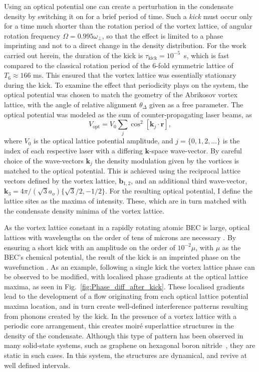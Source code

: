 Using an optical potential one can create a perturbation in the condensate density by switching it on for a brief period of time. Such a {\it kick} must occur only for a time much shorter than the rotation period of the vortex lattice, of angular rotation frequency $\Omega = 0.995\omega_\perp$, so that the effect is limited to a phase imprinting and not to a direct change in the density distribution. For the work carried out herein, the duration of the kick is $\tau_{\text{kick}}=10^{-5}$~s, which is fast compared to the classical rotation period of the 6-fold symmetric lattice of $T_{6} \approx 166 $ ms. This ensured that the vortex lattice was essentially stationary during the kick. To examine the effect that periodicity plays on the system, the optical potential was chosen to match the geometry of the Abrikosov vortex lattice, with the angle of relative alignment $\theta_\Delta$ given as a free parameter. The optical potential was modeled as the sum of counter-propagating laser beams, as
\begin{equation}
    V_{\text{opt}} = V_0\displaystyle\sum_{j}\cos^2 \left[ \textbf{k}_{j}\cdot\textbf{r} \right],
\end{equation}
where $V_0$ is the optical lattice potential amplitude, and $j=\lbrace 0,1,2,\ldots \rbrace$ is the index of each respective laser with a differing $\mathbf{k}$-space wave-vector. By careful choice of the wave-vectors $\textbf{k}_{j}$ the density modulation given by the vortices is matched to the optical potential. This is achieved using the reciprocal lattice vectors defined by the vortex lattice, $\mathbf{b}_{1,2}$, and an additional third wave-vector, $\mathbf{k}_3 = 4\pi/(\sqrt{3}a_o)\{\sqrt{3}/2,-1/2\}$. For the resulting optical potential, I define the lattice sites as the maxima of intensity. These, which are in turn matched with the condensate density minima of the vortex lattice.


As the vortex lattice constant in a rapidly rotating atomic BEC is large, optical lattices with wavelengths on the order of tens of microns are necessary \cite{BEC:Fallani_optexp_2005, AO:Williams_optexp_2008}. By ensuring a short kick with an amplitude on the order of $10^{-2} \mu $, with $\mu$ as the BEC's chemical potential, the result of the kick is an imprinted phase on the wavefunction \cite{Vtx:Dobrek_pra_1999}. As an example, following a single kick the vortex lattice phase can be observed to be modified, with localised phase gradients at the optical lattice maxima, as seen in Fig.~\ref{fig:Phase_diff_after_kick}. These localised gradients lead to the development of a flow originating from each optical lattice potential maxima location, and in turn create well-defined interference patterns resulting from phonons created by the kick. In the presence of a vortex lattice with a periodic core arrangement, this creates moir\'e superlattice structures \cite{SS:Murata_acsn_2010} in the density of the condensate. Although this type of pattern has been observed in many solid-state systems, such as graphene on hexagonal boron nitride~\cite{SS:Yankowitz_natphys_2012}, they are static in such cases. In this system, the structures are dynamical, and revive at well defined intervals.

